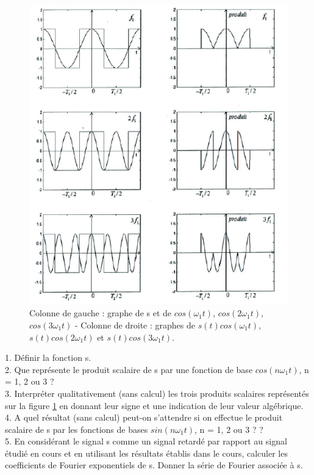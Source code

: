 \documentclass[11pt]{report}
\begin{document}
	\begin{figure}[h!]
		\centering
		\includegraphics[scale=0.8]{images/Exo_Fourier_Lea.png}
		\caption{Colonne de gauche : graphe de s et de $cos(\omega_{1}t)$, $cos(2\omega_{1}t)$, $cos(3\omega_{1}t)$ - Colonne de droite
			: graphes de $s(t)cos(\omega_{1}t)$, $s(t)cos(2\omega_{1}t)$ et $s(t)cos(3\omega_{1}t)$.}	
		\label{Fig:Exo_Fourier_signal_carré} 
	\end{figure}
	
	1. Définir la fonction s.\\
	2. Que représente le produit scalaire de s par une fonction de base $cos(n\omega_{1}t)$, n = 1, 2 ou 3 ?\\
	3. Interpréter qualitativement (sans calcul) les trois produits scalaires représentés sur la figure \ref{Fig:Exo_Fourier_signal_carré} en donnant leur signe et une indication de leur valeur algébrique.\\
	4. A quel résultat (sans calcul) peut-on s'attendre si on effectue le produit scalaire de s par les fonctions de bases $sin(n\omega_{1}t)$, n = 1, 2 ou 3 ? ?\\
	5. En considérant le signal s comme un signal retardé par rapport au signal étudié en
	cours et en utilisant les résultats établis dans le cours, calculer les coefficients de Fourier exponentiels de s. Donner la série de Fourier associée à s.\\
	
\end{document}
